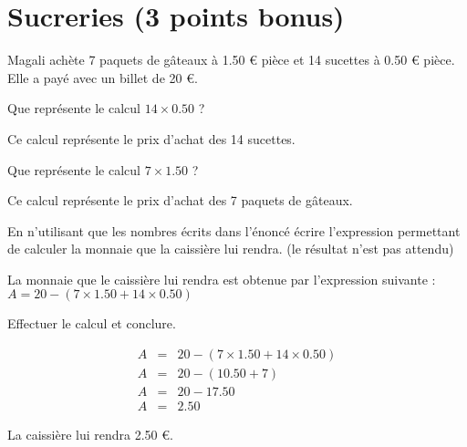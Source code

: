 \section{Sucreries (3 points bonus)}

Magali achète 7 paquets de gâteaux à \num{1.50} € pièce et 14 sucettes à \num{0.50} € pièce. Elle a payé avec un billet de 20 €.

\begin{questions}
	\question[\half] Que représente le calcul $14 \times \num{0.50}$ ?
	\begin{solution}
		Ce calcul représente le prix d'achat des 14 sucettes.
	\end{solution}

	\question[\half] Que représente le calcul $7 \times \num{1.50}$ ?
	\begin{solution}
		Ce calcul représente le prix d'achat des 7  paquets de gâteaux.
	\end{solution}
	
	\question[1] En n'utilisant que les nombres écrits dans l'énoncé écrire l'expression permettant de calculer la monnaie que la caissière lui rendra. (le résultat n'est pas attendu)
	\begin{solution}
		La monnaie que le caissière lui rendra est obtenue par l'expression suivante : $A = 20 - (7 \times \num{1.50} + 14 \times \num{0.50})$
	\end{solution}
		
	\question[1] Effectuer le calcul et conclure. 
	\begin{solution}
		\begin{eqnarray*}
			A &=& 20 - (7 \times \num{1.50} + 14 \times \num{0.50})\\
			A &=& 20 - (\num{10.50} + 7)\\
			A &=& 20 - \num{17.50}\\
			A &=& \num{2.50}
		\end{eqnarray*}
	
	La caissière lui rendra \num{2.50} €.
	\end{solution}
	
\end{questions}